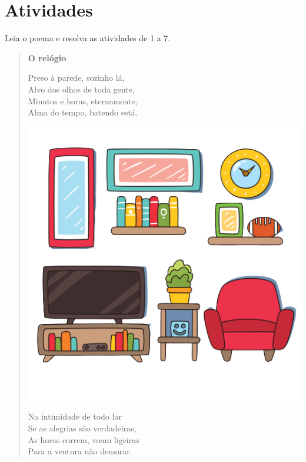 \section*{Atividades}

Leia o poema e resolva as atividades de 1 a 7.



\begin{myquote}
\begin{verse}
\textbf{O relógio}

Preso à parede, sozinho lá,\\
Alvo dos olhos de toda gente,\\
Minutos e horas, eternamente,\\
Alma do tempo, batendo está.

\includegraphics[width=.9\textwidth]{./media/image14a.png}

Na intimidade de todo lar\\
Se as alegrias são verdadeiras,\\
As horas correm, voam ligeiras\\
Para a ventura não demorar.


\end{verse}
\end{myquote}
